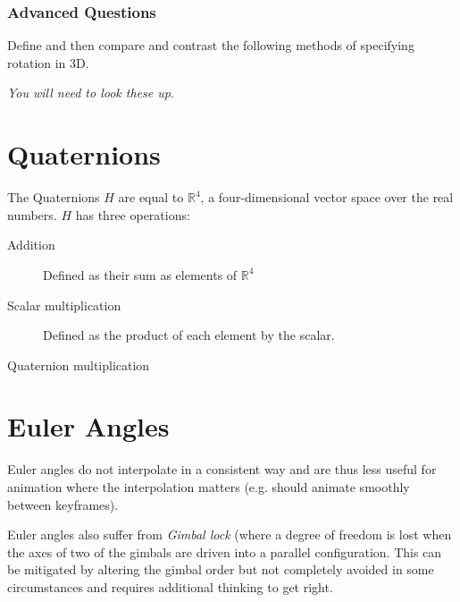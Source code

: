 \documentclass{supervision}
\begin{document}
\section*{Advanced Questions}
\begin{questions}
    \question
    Define and then compare and contrast the following methods of specifying rotation in 3D.
    
    \textit{You will need to look these up}.
    \begin{parts}
        \part{Quaternions}
        \begin{solution}
        The Quaternions $H$ are equal to $\mathbb{R}^4$, a four-dimensional vector space over the real numbers. $H$ has three operations:
        \begin{description}
            \item[Addition]
            Defined as their sum as elements of $\mathbb{R}^4$
            \item[Scalar multiplication]
            Defined as the product of each element by the scalar.
            \item[Quaternion multiplication]
            
            
        \end{description}
        \end{solution}

        \part{Euler Angles}

    \end{parts}
    \begin{solution}
    Euler angles do not interpolate in a consistent way and are thus less useful for animation where the interpolation matters (e.g. should animate smoothly between keyframes).
    
    Euler angles also suffer from \textit{Gimbal lock} (where a degree of freedom is lost when the axes of two of the gimbals are driven into a parallel configuration. This can be mitigated by altering the gimbal order but not completely avoided in some circumstances and requires additional thinking to get right.
    
    
    \end{solution}


\end{questions}
\end{document}
